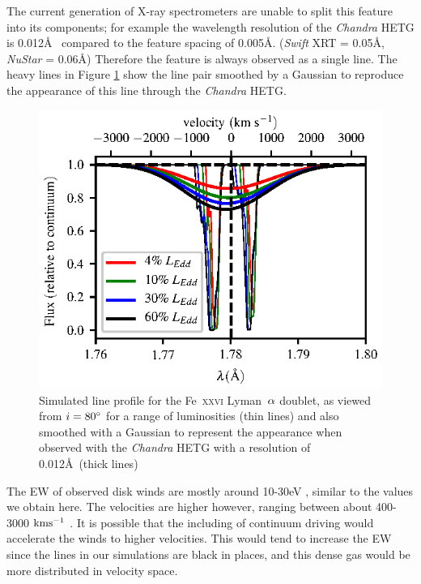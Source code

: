 \documentclass[a4paper,fleqn,usenatbib]{mnras}
\begin{document}
The current generation of X-ray spectrometers are unable to split this feature
into its components; for example the wavelength resolution of the \emph{Chandra}
HETG is 0.012\AA~ compared to the feature spacing of 0.005\AA. (\emph{Swift} XRT = 0.05\AA,
\emph{NuStar} = 0.06\AA)
 Therefore the feature is always observed as a single line. The heavy lines in Figure 
 \ref{figure:line26_smooth}
show the line pair smoothed by a Gaussian to reproduce the appearance of this line
through the \emph{Chandra} HETG. 


\begin{figure}
\includegraphics[width=\columnwidth]{figures/80_degrees_fe26_smooth.eps}
\caption{Simulated line profile for the Fe~\textsc{xxvi} Lyman~$\rm{\alpha}$
doublet, as viewed from $i = 80\degree$ for a range
of luminosities (thin lines) and also smoothed with a Gaussian to represent the appearance when
observed with the \emph{Chandra} HETG with a resolution of 0.012\AA~(thick lines)}
\label{figure:line26_smooth}
\end{figure}

The EW of observed disk winds are mostly around 10-30eV \cite{2012MNRAS.422L..11P}, similar to the 
values we obtain here. The velocities are higher however, ranging between about 400-3000 $\rm{kms^{-1}}$
\cite{2016AN....337..368D}. It is possible that the including of continuum driving would accelerate the winds
to higher velocities. This would tend to increase the EW since the lines in our simulations are black in 
places, and this dense gas would be more distributed in velocity space. 
\end{document}
